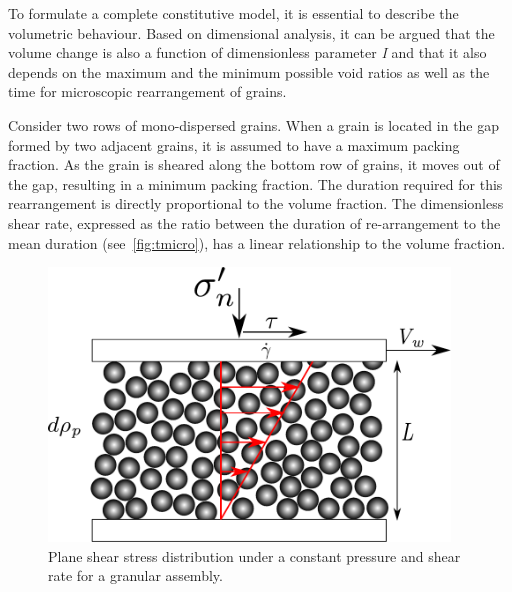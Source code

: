 To formulate a complete constitutive model, it is essential to describe the 
volumetric behaviour. Based on dimensional analysis, it can be argued that the 
volume change is also a function of dimensionless parameter \textit{I} and that 
it also depends on the maximum and the minimum possible void ratios as well as 
the time for microscopic rearrangement of grains.

Consider two rows of mono-dispersed grains. When a grain is located in the gap 
formed by two adjacent grains, it is assumed to have a maximum packing 
fraction. As the grain is sheared along the bottom row of grains, it moves out 
of the gap, resulting in a minimum packing fraction. The duration required for 
this rearrangement is directly proportional to the volume fraction. The 
dimensionless shear rate, expressed as the ratio between the duration of 
re-arrangement to the mean duration (see~\cref{fig:tmicro}), has a linear 
relationship to the volume fraction.

\begin{figure}[tbhp]
\centering
\includegraphics[width=0.95\textwidth]{Rheology}
\caption{Plane shear stress distribution under a constant pressure and shear 
rate for a granular assembly.}
\label{fig:rheology}
\end{figure}

